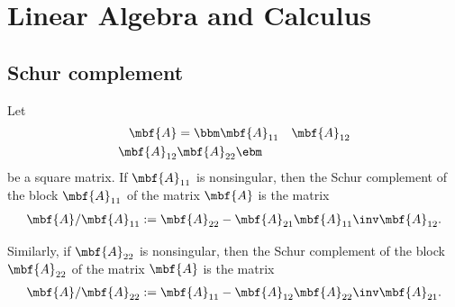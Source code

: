 \chapter{Linear Algebra and Calculus}
\section{Schur complement}
\begin{mytheorem}    
    Let 
    \begin{align}
        \mbf{A} &= 
        \bbm
            \mbf{A}_{11} & \mbf{A}_{12}\\
            \mbf{A}_{12} & \mbf{A}_{22}
        \ebm
    \end{align}
    be a square matrix. If $\mbf{A}_{11}$ is nonsingular, then the Schur complement of the block $\mbf{A}_{11}$ of the matrix $\mbf{A}$ is the matrix
    \begin{align}
        \mbf{A}/\mbf{A}_{11} := \mbf{A}_{22} - \mbf{A}_{21}\mbf{A}_{11}\inv\mbf{A}_{12}.
    \end{align}
    
    Similarly, if $\mbf{A}_{22}$ is nonsingular, then the Schur complement of the block $\mbf{A}_{22}$ of the matrix $\mbf{A}$ is the matrix
    \begin{align}
        \mbf{A}/\mbf{A}_{22} := \mbf{A}_{11} - \mbf{A}_{12}\mbf{A}_{22}\inv\mbf{A}_{21}.
    \end{align}
    \triqed
\end{mytheorem}


